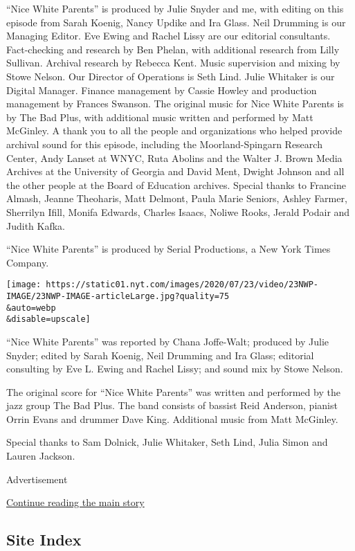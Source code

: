 ``Nice White Parents'' is produced by Julie Snyder and me, with editing
on this episode from Sarah Koenig, Nancy Updike and Ira Glass. Neil
Drumming is our Managing Editor. Eve Ewing and Rachel Lissy are our
editorial consultants. Fact-checking and research by Ben Phelan, with
additional research from Lilly Sullivan. Archival research by Rebecca
Kent. Music supervision and mixing by Stowe Nelson. Our Director of
Operations is Seth Lind. Julie Whitaker is our Digital Manager. Finance
management by Cassie Howley and production management by Frances
Swanson. The original music for Nice White Parents is by The Bad Plus,
with additional music written and performed by Matt McGinley. A thank
you to all the people and organizations who helped provide archival
sound for this episode, including the Moorland-Spingarn Research Center,
Andy Lanset at WNYC, Ruta Abolins and the Walter J. Brown Media Archives
at the University of Georgia and David Ment, Dwight Johnson and all the
other people at the Board of Education archives. Special thanks to
Francine Almash, Jeanne Theoharis, Matt Delmont, Paula Marie Seniors,
Ashley Farmer, Sherrilyn Ifill, Monifa Edwards, Charles Isaacs, Noliwe
Rooks, Jerald Podair and Judith Kafka.

``Nice White Parents'' is produced by Serial Productions, a New York
Times Company.

\texttt{[image: https://static01.nyt.com/images/2020/07/23/video/23NWP-IMAGE/23NWP-IMAGE-articleLarge.jpg?quality=75\\\&auto=webp\\\&disable=upscale]}

``Nice White Parents'' was reported by Chana Joffe-Walt; produced by
Julie Snyder; edited by Sarah Koenig, Neil Drumming and Ira Glass;
editorial consulting by Eve L. Ewing and Rachel Lissy; and sound mix by
Stowe Nelson.

The original score for ``Nice White Parents'' was written and performed
by the jazz group The Bad Plus. The band consists of bassist Reid
Anderson, pianist Orrin Evans and drummer Dave King. Additional music
from Matt McGinley.

Special thanks to Sam Dolnick, Julie Whitaker, Seth Lind, Julia Simon
and Lauren Jackson.

Advertisement

\protect\hyperlink{after-bottom}{Continue reading the main story}

\hypertarget{site-index}{%
\subsection{Site Index}\label{site-index}}

